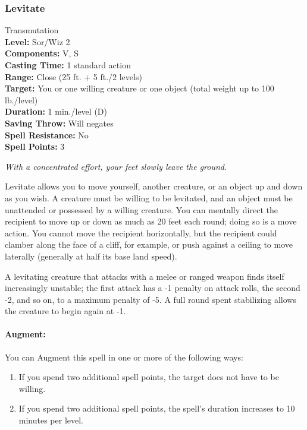 \subsubsection{Levitate}
\label{Spell:Levitate}
Transmutation
\\ \textbf{Level:} Sor/Wiz 2
\\ \textbf{Components:} V, S
\\ \textbf{Casting Time:} 1 standard action
\\ \textbf{Range:} Close (25 ft. + 5 ft./2 levels)
\\ \textbf{Target:} You or one willing creature or one object (total weight up to 100 lb./level)
\\ \textbf{Duration:} 1 min./level (D)
\\ \textbf{Saving Throw:} Will negates
\\ \textbf{Spell Resistance:} No
\\ \textbf{Spell Points:} 3

\emph{With a concentrated effort, your feet slowly leave the ground.}

Levitate allows you to move yourself, another creature, or an object up and down as you wish. 
A creature must be willing to be levitated, and an object must be unattended or possessed by a willing creature. 
You can mentally direct the recipient to move up or down as much as 20 feet each round; 
doing so is a move action. 
You cannot move the recipient horizontally, but the recipient could clamber along the face of a cliff, 
for example, or push against a ceiling to move laterally (generally at half its base land speed).

A levitating creature that attacks with a melee or ranged weapon finds itself increasingly unstable; 
the first attack has a -1 penalty on attack rolls, the second -2, and so on, to a maximum penalty of -5. 
A full round spent stabilizing allows the creature to begin again at -1.

\paragraph{Augment:} You can Augment this spell in one or more of the following ways:
\begin{enumerate}
 \item If you spend two additional spell points, the target does not have to be willing.
 \item If you spend two additional spell points, the spell's duration increases to 10 minutes per level.
\end{enumerate}
